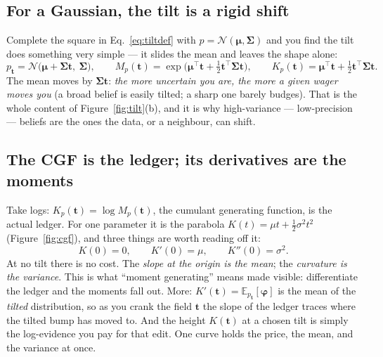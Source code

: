 \documentclass[11pt]{article}
\newcommand{\E}{\mathbb{E}}
\newcommand{\Cov}{\bm{\Sigma}}
\newcommand{\fvec}{\bm{\varphi}}    %
\theoremstyle{definition}
\begin{document}
\subsection{For a Gaussian, the tilt is a rigid shift}

Complete the square in Eq.~\eqref{eq:tiltdef} with $p=\mathcal N(\bm\mu,\Cov)$
and you find the tilt does something very simple --- it slides the mean and
leaves the shape alone:
\begin{equation}
p_{\bm t}=\mathcal N\!\big(\bm\mu+\Cov\bm t,\ \Cov\big),
\qquad
M_p(\bm t)=\exp\!\Big(\bm\mu^{\top}\bm t+\tfrac12\bm t^{\top}\Cov\bm t\Big),
\qquad
K_p(\bm t)=\bm\mu^{\top}\bm t+\tfrac12\bm t^{\top}\Cov\bm t.
\label{eq:gausstilt}
\end{equation}
The mean moves by $\Cov\bm t$: \emph{the more uncertain you are, the more a
given wager moves you} (a broad belief is easily tilted; a sharp one
barely budges). That is the whole content of Figure~\ref{fig:tilt}(b), and
it is why high-variance --- low-precision --- beliefs are the ones the data,
or a neighbour, can shift.

\subsection{The CGF is the ledger; its derivatives are the moments}

Take logs: $K_p(\bm t)=\log M_p(\bm t)$, the cumulant generating function,
is the actual ledger. For one parameter it is the parabola
$K(t)=\mu t+\tfrac12\sigma^2 t^2$ (Figure~\ref{fig:cgf}), and three things
are worth reading off it:
\begin{equation}
K(0)=0,\qquad
K'(0)=\mu,\qquad
K''(0)=\sigma^2.
\end{equation}
At no tilt there is no cost. The \emph{slope at the origin is the mean};
the \emph{curvature is the variance}. This is what ``moment generating''
means made visible: differentiate the ledger and the moments fall out.
More: $K'(\bm t)=\E_{p_{\bm t}}[\fvec]$ is the mean of the \emph{tilted}
distribution, so as you crank the field $\bm t$ the slope of the ledger
traces where the tilted bump has moved to. And the height $K(\bm t)$ at a
chosen tilt is simply the log-evidence you pay for that edit. One curve
holds the price, the mean, and the variance at once.
\end{document}
